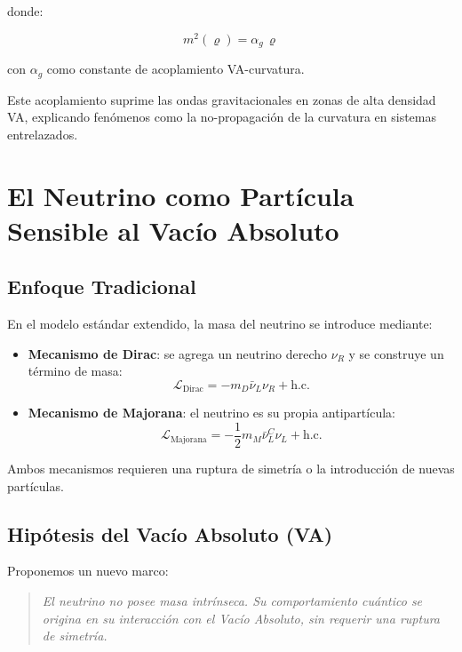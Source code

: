 \documentclass[twoside]{article}
\theoremstyle{definition}
\theoremstyle{remark}
\numberwithin{equation}{section}
\theoremstyle{definition}
\theoremstyle{example}
\theoremstyle{remark}
\numberwithin{equation}{section}%
\begin{document}
		
		donde:
		
		
		\begin{equation}
			m^2(\varrho) = \alpha_g \, \varrho
		\end{equation}
		
		con \( \alpha_g \) como constante de acoplamiento VA-curvatura.
		
		Este acoplamiento suprime las ondas gravitacionales en zonas de alta densidad VA, explicando fenómenos como la no-propagación de la curvatura en sistemas entrelazados.
		
		\section{El Neutrino como Partícula Sensible al Vacío Absoluto}
		
		\subsection{Enfoque Tradicional}
		En el modelo estándar extendido, la masa del neutrino se introduce mediante:
		
		\begin{itemize}
			\item \textbf{Mecanismo de Dirac}: se agrega un neutrino derecho \(\nu_R\) y se construye un término de masa:
			\begin{equation}
				\mathcal{L}_{\text{Dirac}} = - m_D \bar{\nu}_L \nu_R + \text{h.c.}
			\end{equation}
			\item \textbf{Mecanismo de Majorana}: el neutrino es su propia antipartícula:
			\begin{equation}
				\mathcal{L}_{\text{Majorana}} = - \frac{1}{2} m_M \bar{\nu}_L^C \nu_L + \text{h.c.}
			\end{equation}
		\end{itemize}
		
		Ambos mecanismos requieren una ruptura de simetría o la introducción de nuevas partículas.
		
		\subsection{Hipótesis del Vacío Absoluto (VA)}
		Proponemos un nuevo marco:
		
		\begin{quote}
			\textit{El neutrino no posee masa intrínseca. Su comportamiento cuántico se origina en su interacción con el Vacío Absoluto, sin requerir una ruptura de simetría.}
		\end{quote}
		
\end{document}
